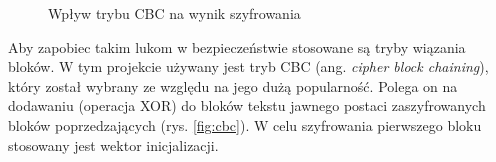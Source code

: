 \begin{figure}[!h]
\hfill
{}
\hfill
{}
\caption{Wpływ trybu CBC na wynik szyfrowania \cite{cbc-comparison}}
\label{fig:cbc-comparison}
\end{figure}

Aby zapobiec takim lukom w bezpieczeństwie stosowane są tryby wiązania bloków. W tym projekcie używany jest tryb CBC (ang. \textit{cipher block chaining}), który został wybrany ze względu na jego dużą popularność. Polega on na dodawaniu (operacja XOR) do bloków tekstu jawnego postaci zaszyfrowanych bloków poprzedzających (rys. \ref{fig:cbc}). W celu szyfrowania pierwszego bloku stosowany jest wektor inicjalizacji.

